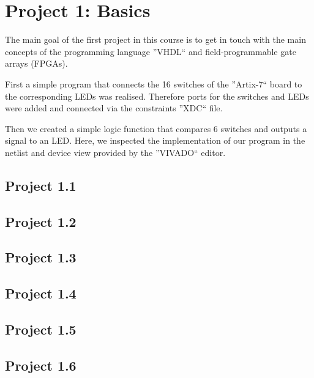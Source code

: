 \documentclass[a4paper, 12pt]{article}
\begin{document}
\setcounter{page}{1}

\section{Project 1: Basics} \label{day1}

The main goal of the first project in this course is to get in touch with the main concepts of the programming language ''VHDL`` and field-programmable gate arrays (FPGAs). 

First a simple program that connects the 16 switches of the ''Artix-7`` board to the corresponding LEDs was realised. Therefore ports for the switches and LEDs were added and connected via the constraints ''XDC`` file.

Then we created a simple logic function that compares 6 switches and outputs a signal to an LED. Here, we inspected the implementation of our program in the netlist and device view provided by the ''VIVADO`` editor.

\subsection{Project 1.1}



\subsection{Project 1.2}



\subsection{Project 1.3}



\subsection{Project 1.4}



\subsection{Project 1.5}



\subsection{Project 1.6}


\end{document}
